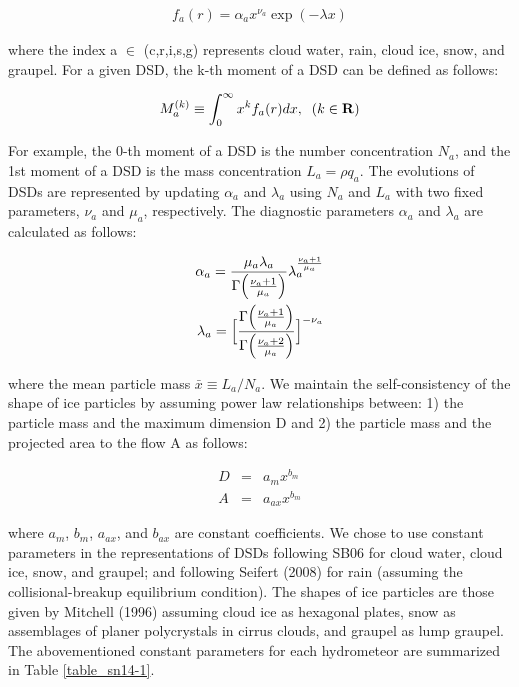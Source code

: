\begin{eqnarray}
f_{a}(r)=\alpha_{a}x^{\nu_{a}}\exp(-\lambda x)
\label{sn7}
\end{eqnarray}

where the index a $\in$ (c,r,i,s,g) represents cloud water, rain, cloud ice, snow, and graupel. For a given DSD, the k-th moment of a DSD can be defined as follows:

\begin{eqnarray}
M^{(k)}_{a}\equiv \int_{0}^{\infty}x^{k}f_{a}(r)dx,\;\;(k\in {\bf R})
\label{sn8}
\end{eqnarray}

For example, the 0-th moment of a DSD is the number concentration $N_{a}$, and the 1st moment of a DSD is the mass concentration $L_{a} = \rho q_{a}$. The evolutions of DSDs are represented by updating $\alpha_{a}$ and $\lambda_{a}$ using $N_{a}$ and $L_{a}$ with two fixed parameters, $\nu_{a}$ and $\mu_{a}$, respectively. The diagnostic parameters $\alpha_{a}$ and $\lambda_{a}$ are calculated as follows:

\begin{eqnarray}
\alpha_{a}=\frac{\mu_{a}\lambda_{a}}{\Gamma\Bigl(\frac{\nu_{a}+1}{\mu_{a}}\Bigr)}\lambda_{a}^{\frac{\nu_{a}+1}{\mu_{a}}}\\
\label{sn9}
\lambda_{a}=\Bigl[\frac{\Gamma\Bigl(\frac{\nu_{a}+1}{\mu_{a}}\Bigr)}{\Gamma\Bigl(\frac{\nu_{a}+2}{\mu_{a}}\Bigr)}\Bigr]^{-\nu_{a}}\nonumber
\end{eqnarray}

where the mean particle mass $\bar{x}\equiv L_{a}/N_{a}$. We maintain the self-consistency of the shape of ice particles by assuming power law relationships between: 1) the particle mass and the maximum dimension D and 2) the particle mass and the projected area to the flow A as follows:

\begin{eqnarray}
D&=&a_{m}x^{b_{m}}\\
\label{sn10}
A&=&a_{ax}x^{b_{m}}
\label{sn11}
\end{eqnarray}

where $a_{m}$, $b_{m}$, $a_{ax}$, and $b_{ax}$ are constant coefficients. We chose to use constant parameters in the representations of DSDs following SB06 for cloud water, cloud ice, snow, and graupel; and following Seifert (2008) for rain (assuming the collisional-breakup equilibrium condition). The shapes of ice particles are those given by Mitchell (1996) assuming cloud ice as hexagonal plates, snow as assemblages of planer polycrystals in cirrus clouds, and graupel as lump graupel. The abovementioned constant parameters for each hydrometeor are summarized in Table \ref{table_sn14-1}.

